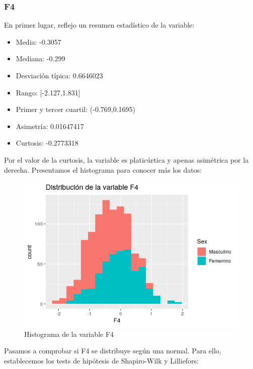 \subsubsection{F4}

En primer lugar, reflejo un resumen estadístico de la variable:

\begin{itemize}
	\item Media: -0.3057
	\item Mediana: -0.299
	\item Desviación típica: 0.6646023
	\item Rango: [-2.127,1.831]
	\item Primer y tercer cuartil: (-0.769,0.1695)
	\item Asimetría: 0.01647417
	\item Curtosis: -0.2773318
\end{itemize}

Por el valor de la curtosis, la variable es platicúrtica y apenas asimétrica por la derecha. Presentamos el histograma para conocer más los datos:

\begin{figure}[H] %
	\centering
	\includegraphics[scale=0.6]{dist-F4.png}  %
	\caption{Histograma de la variable F4} 
	\label{fig:hist-F4}
\end{figure}

Pasamos a comprobar si F4 se distribuye según una normal. Para ello, establecemos los tests de hipótesis de Shapiro-Wilk y Lilliefors:


